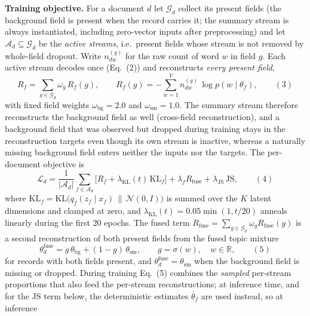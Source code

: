 \documentclass[Journal,letterpaper,NoLists]{ascelike-new}
\begin{document}
\noindent\textbf{Training objective.} For a document $d$ let $\mathcal{G}_d$ collect its present fields (the background field is present
when the record carries it; the summary stream is always instantiated, including zero-vector
inputs after preprocessing) and let
$\mathcal{A}_d\subseteq\mathcal{G}_d$ be the \emph{active streams}, i.e.\ present fields whose
stream is not removed by whole-field dropout. Write $n^{(g)}_{dw}$ for the raw count of word $w$
in field $g$. Each active stream decodes once (Eq.~(2)) and reconstructs
\emph{every present field},
\begin{equation}
R_f=\sum_{g\in\mathcal{G}_d}\omega_g\,R_f(g),\qquad
R_f(g)=-\sum_{w=1}^{V} n^{(g)}_{dw}\,\log p\!\left(w\mid\theta_f\right),
\label{eq:recon}
\qquad(3)\end{equation}
with fixed field weights $\omega_{\mathrm{bg}}=2.0$ and $\omega_{\mathrm{sm}}=1.0$. The summary
stream therefore reconstructs the background field as well (cross-field reconstruction), and a
background field that was observed but dropped during training stays in the reconstruction
targets even though its own stream is inactive, whereas a naturally missing background field
enters neither the inputs nor the targets. The per-document objective is
\begin{equation}
\mathcal{L}_d=\frac{1}{|\mathcal{A}_d|}\sum_{f\in\mathcal{A}_d}
\Big[R_f+\lambda_{\mathrm{KL}}(t)\,\mathrm{KL}_f\Big]
+\lambda_f R_{\mathrm{fuse}}+\lambda_{\mathrm{JS}}\,\mathrm{JS},
\label{eq:total}
\qquad(4)\end{equation}
where $\mathrm{KL}_f=\mathrm{KL}\big(q_f(z_f\mid x_f)\,\|\,\mathcal N(0,I)\big)$ is summed over
the $K$ latent dimensions and clamped at zero, and $\lambda_{\mathrm{KL}}(t)=0.05\min(1,t/20)$
anneals linearly during the first 20 epochs. The fused term
$R_{\mathrm{fuse}}=\sum_{g\in\mathcal{G}_d}\omega_g R_{\mathrm{fuse}}(g)$ is a second
reconstruction of both present fields from the fused topic mixture
\begin{equation}
\theta_d^{\mathrm{fuse}}=g\,\theta_{\mathrm{bg}}+(1-g)\,\theta_{\mathrm{sm}},
\qquad g=\sigma(w),\quad w\in\mathbb{R},
\label{eq:lfuse}
\qquad(5)\end{equation}
for records with both fields present, and
$\theta_d^{\mathrm{fuse}}=\theta_{\mathrm{sm}}$ when the background field is missing or
dropped. During training Eq.~(5) combines the \emph{sampled} per-stream
proportions that also feed the per-stream reconstructions; at inference time, and for the JS
term below, the deterministic estimates $\bar\theta_f$ are used instead, so at inference
\end{document}
